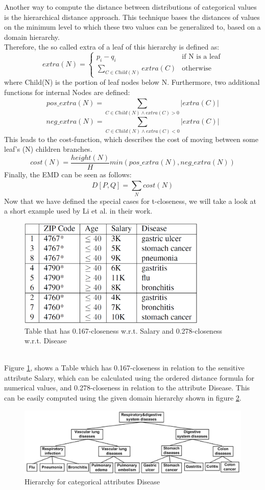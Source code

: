 \documentclass[12pt, a4paper,oneside]{report}
\begin{document}
Another way to compute the distance between distributions of categorical values is the hierarchical distance approach. This technique bases the distances of values on the minimum level to which these two values can be generalized to, based on a domain hierarchy\cite{Li2007}.\\ Therefore, the so called extra of a leaf of this hierarchy is defined as: 
\[ extra(N) = \begin{cases} p_i - q_i & \text{if N is a leaf} \\ \sum_{C\in Child(N)}^{}extra(C) & \text{otherwise} \end{cases} \]
where Child(N) is the portion of leaf nodes below N. Furthermore, two additional functions for internal Nodes are defined:
\[ pos\_extra(N) = \sum_{C\in Child(N)\wedge extra(C)>0}^{}|extra(C)|\]
\[ neg\_extra(N) = \sum_{C\in Child(N)\wedge extra(C)<0}^{}|extra(C)|\]
This leads to the cost-function, which describes the cost of moving between some leaf's (N) children branches.
\[ cost(N) = \frac{height(N)}{H}min(pos\_extra(N),neg\_extra(N)) \]
Finally, the EMD can be seen as follows:
\[  D[P,Q] = \sum_{N}^{}cost(N) \]
Now that we have defined the special cases for t-closeness, we will take a look at a short example used by Li et al. in their work\cite{Li2007}.
\begin{figure}[h]
	\centering
	\includegraphics[width=0.8\textwidth]{t-closeness-example}
	\caption{Table that has 0.167-closeness w.r.t.
	Salary and 0.278-closeness w.r.t. Disease \cite{Li2007}}
	\label{fig:4}
\end{figure}\\
Figure \ref{fig:4}, shows a Table which has 0.167-closeness in relation to the sensitive attribute Salary, which can be calculated using the ordered distance formula for numerical values, and 0.278-closeness in relation to the attribute Disease. This can be easily computed using the given domain hierarchy shown in figure \ref{fig:5}.   
\begin{figure}[h]
	\centering
	\includegraphics[width=1.0\textwidth]{hierarchy-t-close}
	\caption{Hierarchy for categorical attributes Disease \cite{Li2007}}
	\label{fig:5}
\end{figure}
\end{document}
